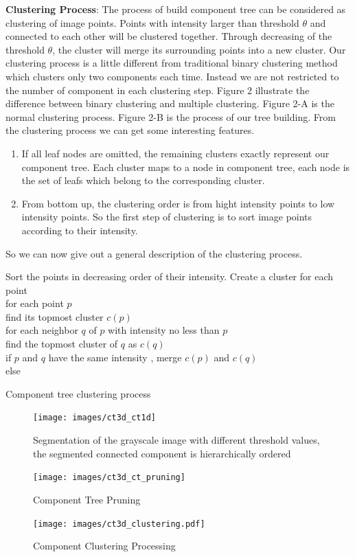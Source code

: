 \textbf{Clustering Process}: The process of build component tree can be considered as clustering of image points. Points with intensity larger than threshold $\theta$ and connected to each other will be clustered together. Through decreasing of the threshold $\theta$, the cluster will merge its surrounding points into a new cluster. Our clustering process is a little different from traditional binary clustering method which clusters only two components each time. Instead we are not restricted to the number of component in each clustering step. Figure 2 illustrate the difference between binary clustering and multiple clustering. Figure 2-A is the normal clustering process. Figure 2-B is the process of our tree building. From the clustering process we can get some interesting features.
\begin{enumerate} 
	\item If all leaf nodes are omitted, the remaining clusters exactly represent our component tree. Each cluster maps to a node in component tree, each node is the set of leafs which belong to the corresponding cluster. 
	\item From bottom up, the clustering order is from hight intensity points to low intensity points. So the first step of clustering is to sort image points according to their intensity.
\end{enumerate} 
So we can now give out a general description of the clustering process. 

\begin{algorithm}
\SetAlgoLined
{}
Sort the points in decreasing order of their intensity.
Create a cluster for each point\\
for each point $p$\\
	find its topmost cluster $c(p)$ \\
	for each neighbor $q$ of $p$ with intensity no less than $p$\\
		find the topmost cluster of $q$ as $c(q)$\\ 
		if $p$ and $q$ have the same intensity , merge $c(p)$ and  $c(q)$ \\
		else 
\caption{Component tree clustering process}
\label{alg:ct3d-clustering}
\end{algorithm}

\begin{figure}[htbp]
\centering
\texttt{[image: images/ct3d\_ct1d]}
\caption{Segmentation of the grayscale image with different threshold values, the segmented connected component is hierarchically ordered}
\label{fig:ct3d-ct1d}
\end{figure}

\begin{figure}[htbp]
\centering
\texttt{[image: images/ct3d\_ct\_pruning]}
\caption{Component Tree Pruning}
\label{fig:ct3d-ct-pruning}
\end{figure}


\begin{figure}[htbp]
\centering
\texttt{[image: images/ct3d\_clustering.pdf]}
\caption{Component Clustering Processing}
\label{fig:aa}
\end{figure}
